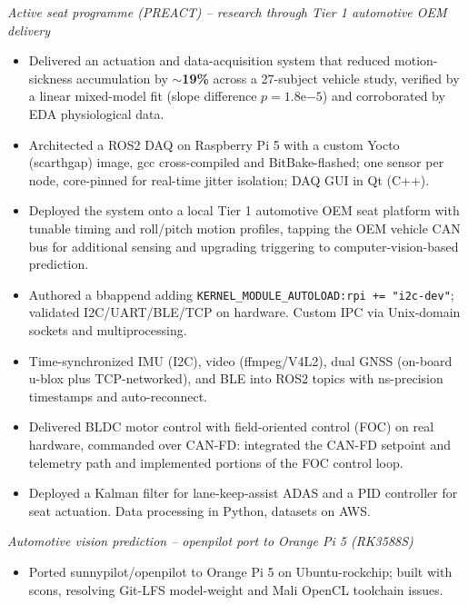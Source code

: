 \documentclass[11pt,a4paper,sans]{moderncv}
\begin{document}
\begin{itemize}
{{\begin{itemize}
\end{itemize}
\vspace{2pt}
\textit{Active seat programme (PREACT) -- research through Tier 1 automotive OEM delivery}
\begin{itemize}
    \item Delivered an actuation and data-acquisition system that reduced motion-sickness accumulation by \textbf{${\sim}$19\%} across a 27-subject vehicle study, verified by a linear mixed-model fit (slope difference $p=1.8\mathrm{e}{-5}$) and corroborated by EDA physiological data.
    \item Architected a ROS2 DAQ on Raspberry Pi 5 with a custom Yocto (scarthgap) image, gcc cross-compiled and BitBake-flashed; one sensor per node, core-pinned for real-time jitter isolation; DAQ GUI in Qt (C++).
    \item Deployed the system onto a local Tier 1 automotive OEM seat platform with tunable timing and roll/pitch motion profiles, tapping the OEM vehicle CAN bus for additional sensing and upgrading triggering to computer-vision-based prediction.
    \item Authored a bbappend adding \texttt{KERNEL\_MODULE\_AUTOLOAD:rpi += "i2c-dev"}; validated I2C/UART/BLE/TCP on hardware. Custom IPC via Unix-domain sockets and multiprocessing.
    \item Time-synchronized IMU (I2C), video (ffmpeg/V4L2), dual GNSS (on-board u-blox plus TCP-networked), and BLE into ROS2 topics with ns-precision timestamps and auto-reconnect.
    \item Delivered BLDC motor control with field-oriented control (FOC) on real hardware, commanded over CAN-FD: integrated the CAN-FD setpoint and telemetry path and implemented portions of the FOC control loop.
    \item Deployed a Kalman filter for lane-keep-assist ADAS and a PID controller for seat actuation. Data processing in Python, datasets on AWS.
\end{itemize}
\vspace{2pt}
\textit{Automotive vision prediction -- openpilot port to Orange Pi 5 (RK3588S)}
\begin{itemize}
    \item Ported sunnypilot/openpilot to Orange Pi 5 on Ubuntu-rockchip; built with scons, resolving Git-LFS model-weight and Mali OpenCL toolchain issues.

\end{itemize}}}
\end{itemize}
\end{document}
